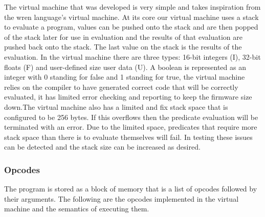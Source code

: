 The virtual machine that was developed is very simple and takes inspiration from the wren \cite{wren} language's virtual machine. At its core our virtual machine uses a stack to evaluate a program, values can be pushed onto the stack and are then popped of the stack later for use in evaluation and the results of that evaluation are pushed back onto the stack. The last value on the stack is the results of the evaluation. In the virtual machine there are three types: 16-bit integers (I), 32-bit floats (F) and user-defined size user data (U). A boolean is represented as an integer with 0 standing for false and 1 standing for true, the virtual machine relies on the compiler to have generated correct code that will be correctly evaluated, it has limited error checking and reporting to keep the firmware size down.The virtual machine also has a limited and fix stack space that is configured to be 256 bytes. If this overflows then the predicate evaluation will be terminated with an error. Due to the limited space, predicates that require more stack space than there is to evaluate themselves will fail. In testing these issues can be detected and the stack size can be increased as desired.

\subsubsection{Opcodes}

The program is stored as a block of memory that is a list of opcodes followed by their arguments. The following are the opcodes implemented in the virtual machine and the semantics of executing them.

